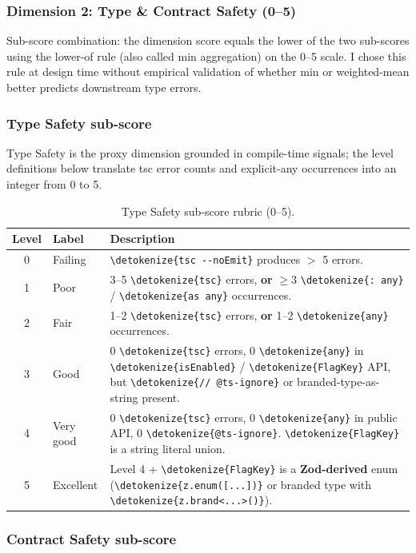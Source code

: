 \documentclass[12pt,a4paper]{report}
\newcommand{\code}[1]{\texttt{\nolinkurl{\detokenize{#1}}}}
\begin{document}
\subsubsection{Dimension 2: Type \& Contract Safety (0--5)}

Sub-score combination: the dimension score equals the lower of the two sub-scores using the lower-of rule (also called min aggregation) on the 0--5 scale. I chose this rule at design time without empirical validation of whether min or weighted-mean better predicts downstream type errors.

\subsubsection{Type Safety sub-score}

Type Safety is the proxy dimension grounded in compile-time signals; the level definitions below translate tsc error counts and explicit-any occurrences into an integer from 0 to 5.

\begin{table}[H]
\centering
\begin{tabular}{clp{9cm}}
\toprule
\textbf{Level} & \textbf{Label} & \textbf{Description} \\
\midrule
0 & Failing & \code{tsc --noEmit} produces $>$ 5 errors. \\
1 & Poor & 3--5 \code{tsc} errors, \textbf{or} $\geq 3$ \code{: any} / \code{as any} occurrences. \\
2 & Fair & 1--2 \code{tsc} errors, \textbf{or} 1--2 \code{any} occurrences. \\
3 & Good & 0 \code{tsc} errors, 0 \code{any} in \code{isEnabled} / \code{FlagKey} API, but \code{// @ts-ignore} or branded-type-as-string present. \\
4 & Very good & 0 \code{tsc} errors, 0 \code{any} in public API, 0 \code{@ts-ignore}. \code{FlagKey} is a string literal union. \\
5 & Excellent & Level 4 + \code{FlagKey} is a \textbf{Zod-derived} enum (\code{z.enum([...])} or branded type with \code{z.brand<...>()}). \\
\bottomrule
\end{tabular}
\caption{Type Safety sub-score rubric (0--5).}
\label{tab:rubric-type}
\end{table}

\subsubsection{Contract Safety sub-score}
\end{document}
